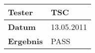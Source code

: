 \begin{table}[h]
\begin{center}
\begin{tabular}{|p{3.5cm}|p{11cm}|}
\textbf{Tester} & TSC\\
\hline
\textbf{Datum} & 13.05.2011\\
\hline
\textbf{Ergebnis} & PASS\\
\hline
\end{tabular}
\end{center}
\label{default}
\end{table}